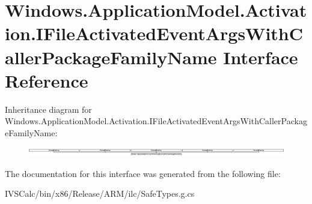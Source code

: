 \hypertarget{interface_windows_1_1_application_model_1_1_activation_1_1_i_file_activated_event_args_with_caller_package_family_name}{}\section{Windows.\+Application\+Model.\+Activation.\+I\+File\+Activated\+Event\+Args\+With\+Caller\+Package\+Family\+Name Interface Reference}
\label{interface_windows_1_1_application_model_1_1_activation_1_1_i_file_activated_event_args_with_caller_package_family_name}
Inheritance diagram for Windows.\+Application\+Model.\+Activation.\+I\+File\+Activated\+Event\+Args\+With\+Caller\+Package\+Family\+Name\+:\begin{figure}[H]
\begin{center}
\leavevmode
\includegraphics[height=0.408759cm]{interface_windows_1_1_application_model_1_1_activation_1_1_i_file_activated_event_args_with_caller_package_family_name}
\end{center}
\end{figure}


The documentation for this interface was generated from the following file\+:\begin{DoxyCompactItemize}
\item 
I\+V\+S\+Calc/bin/x86/\+Release/\+A\+R\+M/ilc/Safe\+Types.\+g.\+cs\end{DoxyCompactItemize}
